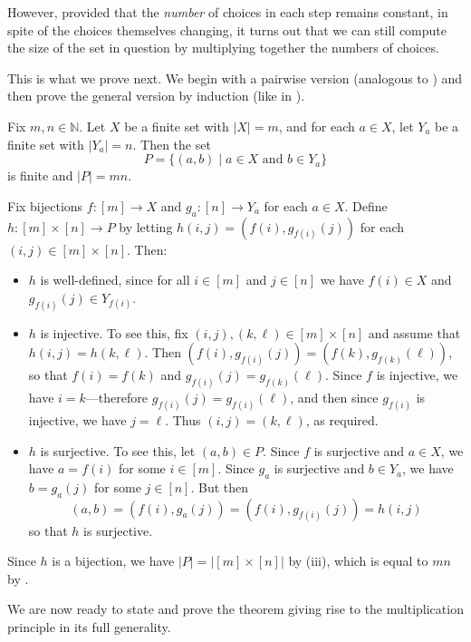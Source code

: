 However, provided that the \textit{number} of choices in each step remains constant, in spite of the choices themselves changing, it turns out that we can still compute the size of the set in question by multiplying together the numbers of choices.

This is what we prove next. We begin with a pairwise version (analogous to ) and then prove the general version by induction (like in ).

\begin{lemma}
\label{lemMultiplicationPrinciplePairwise}
Fix $m,n \in \mathbb{N}$. Let $X$ be a finite set with $|X|=m$, and for each $a \in X$, let $Y_a$ be a finite set with $|Y_a|=n$. Then the set
\[ P = \{ (a, b) \mid a \in X \text{ and } b \in Y_a \} \]
is finite and $|P| = mn$.
\end{lemma}

\begin{cproof}
Fix bijections $f : [m] \to X$ and $g_a : [n] \to Y_a$ for each $a \in X$. Define $h : [m] \times [n] \to P$ by letting $h(i,j) = (f(i), g_{f(i)}(j))$ for each $(i,j) \in [m] \times [n]$. Then:
\begin{itemize}
\item $h$ is well-defined, since for all $i \in [m]$ and $j \in [n]$ we have $f(i) \in X$ and $g_{f(i)}(j) \in Y_{f(i)}$.
\item $h$ is injective. To see this, fix $(i,j), (k,\ell) \in [m] \times [n]$ and assume that $h(i,j) = h(k,\ell)$. Then $(f(i),g_{f(i)}(j)) = (f(k),g_{f(k)}(\ell))$, so that $f(i)=f(k)$ and $g_{f(i)}(j) = g_{f(k)}(\ell)$. Since $f$ is injective, we have $i=k$---therefore $g_{f(i)}(j) = g_{f(i)}(\ell)$, and then since $g_{f(i)}$ is injective, we have $j=\ell$. Thus $(i,j) = (k,\ell)$, as required.
\item $h$ is surjective. To see this, let $(a,b) \in P$. Since $f$ is surjective and $a \in X$, we have $a=f(i)$ for some $i \in [m]$. Since $g_a$ is surjective and $b \in Y_a$, we have $b=g_a(j)$ for some $j \in [n]$. But then
\[ (a,b) = (f(i), g_a(j)) = (f(i), g_{f(i)}(j)) = h(i,j) \]
so that $h$ is surjective.
\end{itemize}

Since $h$ is a bijection, we have $|P| = |[m] \times [n]|$ by (iii), which is equal to $mn$ by .
\end{cproof}

We are now ready to state and prove the theorem giving rise to the multiplication principle in its full generality.

